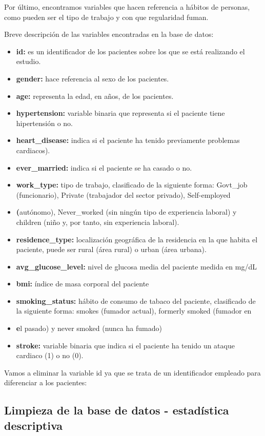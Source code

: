 \documentclass[
]{article}
\begin{document}
Por último, encontramos variables que hacen referencia a hábitos de
personas, como pueden ser el tipo de trabajo y con que regularidad
fuman.

Breve descripción de las variables encontradas en la base de datos:

\begin{itemize}
\item \textbf {id:} es un identificador de los pacientes sobre los que se está realizando el estudio.
\item \textbf {gender:} hace referencia al sexo de los pacientes.
\item \textbf {age:} representa la edad, en años, de los pacientes.
\item \textbf {hypertension:} variable binaria que representa si el paciente tiene hipertensión o no.
\item \textbf {heart_disease:} indica si el paciente ha tenido previamente problemas cardiacos).
\item \textbf {ever_married:} indica si el paciente se ha casado o no.
\item \textbf {work_type:} tipo de trabajo, clasificado de la siguiente forma: Govt_job (funcionario), Private (trabajador del sector privado), Self-employed \item \textbf (autónomo), Never_worked (sin ningún tipo de experiencia laboral) y children (niño y, por tanto, sin experiencia laboral).
\item \textbf {residence_type:} localización geográfica de la residencia en la que habita el paciente, puede ser rural (área rural) o urban (área urbana).
\item \textbf {avg_glucose_level:} nivel de glucosa media del paciente medida en mg/dL
\item \textbf {bmi:} índice de masa corporal del paciente
\item \textbf {smoking_status:} hábito de consumo de tabaco del paciente, clasificado de la siguiente forma: smokes (fumador actual), formerly smoked (fumador en \item \textbf el pasado) y never smoked (nunca ha fumado)
\item \textbf {stroke:} variable binaria que indica si el paciente ha tenido un ataque cardiaco (1) o no (0).
\end{itemize}

Vamos a eliminar la variable id ya que se trata de un identificador
empleado para diferenciar a los pacientes:

\hypertarget{limpieza-de-la-base-de-datos---estaduxedstica-descriptiva}{%
\subsection{Limpieza de la base de datos - estadística
descriptiva}\label{limpieza-de-la-base-de-datos---estaduxedstica-descriptiva}}
\end{document}
